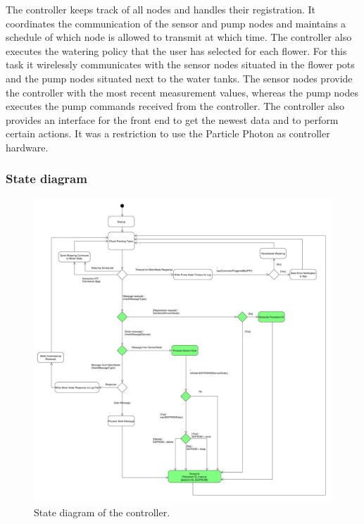 The controller keeps track of all nodes and handles their registration. It coordinates the communication of the sensor and pump nodes and maintains a schedule of which node is allowed to transmit at which time.
The controller also executes the watering policy that the user has selected for each flower.
For this task it wirelessly communicates with the sensor nodes situated in the flower pots and the pump nodes situated next to the water tanks. The sensor nodes provide the controller with the most recent measurement values, whereas the pump nodes executes the pump commands received from the controller.
The controller also provides an interface for the front end to get the newest data and to perform certain actions.
It was a restriction to use the Particle Photon as controller hardware.

\subsubsection{State diagram}

\begin{figure}[h!]
	\begin{center}
	\includegraphics[scale=0.24]{images/ControlNode_Diagramm.pdf}
	\caption{State diagram of the controller.}
	\label{Setup_overview}
	\end{center}
\end{figure}


